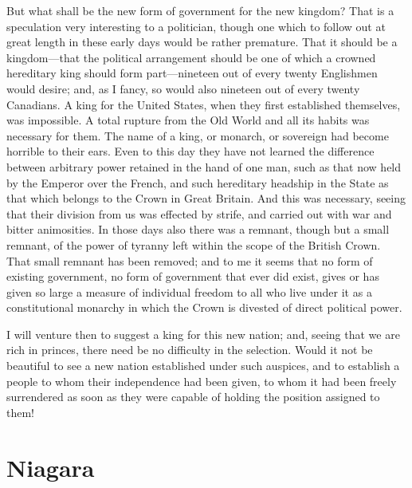 But what shall be the new form of government for the new kingdom?
That is a speculation very interesting to a politician, though one
which to follow out at great length in these early days would be
rather premature.  That it should be a kingdom---that the political
arrangement should be one of which a crowned hereditary king should
form part---nineteen out of every twenty Englishmen would desire;
and, as I fancy, so would also nineteen out of every twenty
Canadians.  A king for the United States, when they first
established themselves, was impossible.  A total rupture from the
Old World and all its habits was necessary for them.  The name of a
king, or monarch, or sovereign had become horrible to their ears.
Even to this day they have not learned the difference between
arbitrary power retained in the hand of one man, such as that now
held by the Emperor over the French, and such hereditary headship
in the State as that which belongs to the Crown in Great Britain.
And this was necessary, seeing that their division from us was
effected by strife, and carried out with war and bitter
animosities.  In those days also there was a remnant, though but a
small remnant, of the power of tyranny left within the scope of the
British Crown.  That small remnant has been removed; and to me it
seems that no form of existing government, no form of government
that ever did exist, gives or has given so large a measure of
individual freedom to all who live under it as a constitutional
monarchy in which the Crown is divested of direct political power.

I will venture then to suggest a king for this new nation; and,
seeing that we are rich in princes, there need be no difficulty in
the selection.  Would it not be beautiful to see a new nation
established under such auspices, and to establish a people to whom
their independence had been given, to whom it had been freely
surrendered as soon as they were capable of holding the position
assigned to them!



\chapter{Niagara}


